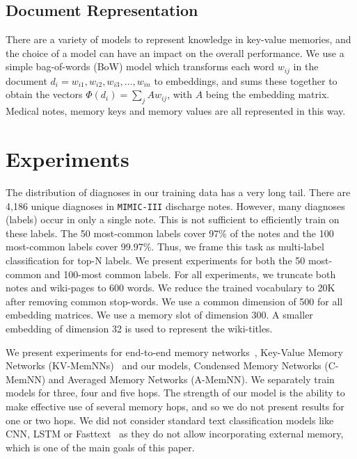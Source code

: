     \subsection{Document Representation}
    There are a variety of models to represent knowledge in key-value memories, and the choice of a model can have an impact on the overall performance. We use a simple bag-of-words (BoW) model which transforms each word $w_{ij}$ in the document $d_i = {w_{i1}, w_{i2}, w_{i3}, \ldots, w_{in}}$ to embeddings, and sums these together to obtain the vectors $\Phi(d_i) = \sum_jAw_{ij}$, with $A$ being the embedding matrix. Medical notes, memory keys and memory values are all represented in this way.

    

\section{Experiments}
    The distribution of diagnoses in our training data has a very long tail. There are 4,186 unique diagnoses in \texttt{MIMIC-III} discharge notes. However, many diagnoses (labels) occur in only a single note. This is not sufficient to efficiently train on these labels. The 50 most-common labels cover 97\%  of the notes and the 100 most-common labels cover 99.97\%. Thus, we frame this task as multi-label classification for top-N labels. We present experiments for both the 50 most-common and 100-most common labels. For all experiments, we truncate both notes and wiki-pages to 600 words. We reduce the trained vocabulary to 20K after removing common stop-words. We use a common dimension of 500 for all embedding matrices. We use a memory slot of dimension 300. A smaller embedding of dimension 32 is used to represent the wiki-titles.
    
    We present experiments for end-to-end memory networks~\cite{NIPS2015_end_to_end}, Key-Value Memory Networks (KV-MemNNs)~\cite{DBLP:journals/corr/MillerFDKBW16} and our models, Condensed Memory Networks (C-MemNN) and Averaged Memory Networks (A-MemNN). We separately train models for three, four and five hops. The strength of our model is the ability to make effective use of several memory hops, and so we do not present results for one or two hops. We did not consider standard text classification models like CNN, LSTM or Fasttext~\cite{joulin2016bag} as they do not allow incorporating external memory, which is one of the main goals of this paper.
  
